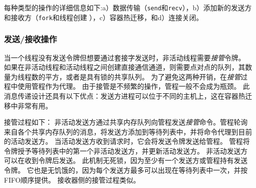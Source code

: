 每种类型的操作的详细信息如下:a）数据传输（\texttt {send}和\texttt {recv}），b）添加新的发送方和接收方（\texttt {fork}和线程创建 ），c）容器热迁移，和d）连接关闭。

\subsubsection{发送/接收操作}
\label{socksdirect:subsubsec:fork_rdwr}

当一个线程没有发送令牌但想要通过套接字发送时，非活动线程需要\emph {接管}令牌。
如果在非活动线程和活动线程之间创建直接通信通道，则需要点对点的队列，其数量为线程数的平方，或者是具有锁的共享队列。
为了避免这两种开销，在\emph {接管}过程中使用管程作为代理。
由于接管是不频繁的操作，管程一般不会成为瓶颈。
此消息传递设计还具有以下优点：发送方进程可以位于不同的主机上，这在容器热迁移中非常有用。

接管过程如下：
非活动发送方通过共享内存队列向管程发送\emph {接管}命令。管程轮询来自各个共享内存队列的消息，将发送方添加到等待列表中，并将命令代理到目前的活动发送方。
当活动发送方收到请求时，它会将发送令牌发送给管程。
管程将令牌授予等待列表中的第一个非活动发送方，并更新活动发送方。
非活动发送方可以在收到令牌后发送。
此机制无死锁，因为至少有一个发送方或管程持有发送令牌。
它也是无饥饿的，因为每个发送方最多可以出现在等待列表中一次，并按FIFO顺序提供。
接收器侧的接管过程类似。

